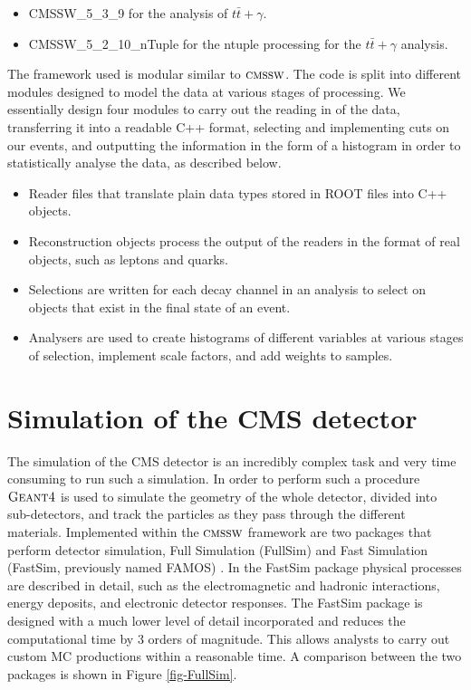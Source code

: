 \begin{itemize}
	\item CMSSW\_5\_3\_9 for the analysis of $t\bar{t}+\gamma$.
	\item CMSSW\_5\_2\_10\_nTuple for the ntuple processing for the $t\bar{t}+\gamma$ analysis.
\end{itemize} 

The framework used is modular similar to ${\textsc{cmssw}}$. The code is split into different modules designed to model the data at various stages of processing. We essentially design four modules to carry out the reading in of the data, transferring it into a readable C++ format, selecting and implementing cuts on our events, and outputting the information in the form of a histogram in order to statistically analyse the data, as described below. 

\begin{itemize}
	\item Reader files that translate plain data types stored in ROOT files into C++ objects. 
	\item Reconstruction objects process the output of the readers in the format of real objects, such as leptons and quarks.
	\item Selections are written for each decay channel in an analysis to select on objects that exist in the final state of an event.
	\item Analysers are used to create histograms of different variables at various stages of selection, implement scale factors, and add weights to samples. 
\end{itemize}

\section{Simulation of the CMS detector}

The simulation of the CMS detector is an incredibly complex task and very time consuming to run such a simulation. In order to perform such a procedure ${\textsc{Geant4}}$ \cite{GEANT4} is used to simulate the geometry of the whole detector, divided into sub-detectors, and track the particles as they pass through the different materials. Implemented within the ${\textsc{cmssw}}$ framework are two packages that perform detector simulation, Full Simulation (FullSim) \cite{FullSim} and Fast Simulation (FastSim, previously named FAMOS) \cite{1742-6596-513-2-022012}.  
In the FastSim package physical processes are described in detail, such as the electromagnetic and hadronic interactions, energy deposits, and electronic detector responses. The FastSim package is designed with a much lower level of detail incorporated and reduces the computational time by 3 orders of magnitude. This allows analysts to carry out custom MC productions within a reasonable time. A comparison between the two packages is shown in Figure \ref{fig-FullSim}. 

